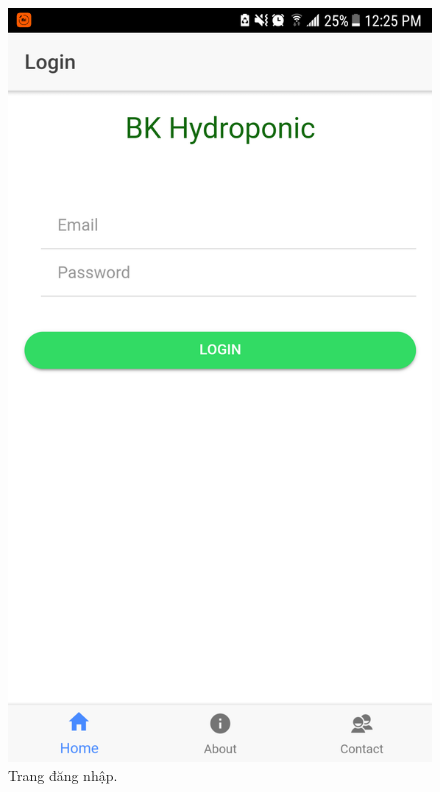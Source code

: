 \documentclass[a4paper,12pt,oneside]{article}
\begin{document}
\begin{figure}[H]
\begin{center}
\includegraphics[scale=.25]{hinh/mobile_login.png}
\end{center}
\caption{Trang đăng nhập.}
\end{figure}
\end{document}
